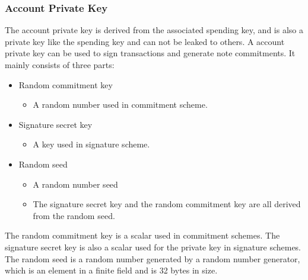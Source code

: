 \subsubsection{Account Private Key}\label{section: account-private-key}

The account private key is derived from the associated spending key, and is also a private key like the spending key and can not be leaked to others. A account private key can be used to sign transactions and generate note commitments. It mainly consists of three parts:

\begin{itemize}
    \item Random commitment key
        \begin{itemize}
            \item A random number used in commitment scheme.
        \end{itemize}
    \item Signature secret key
        \begin{itemize}
            \item A key used in signature scheme.
        \end{itemize}
    \item Random seed
        \begin{itemize}
            \item A random number seed
            \item The signature secret key and the random commitment key are all derived from the random seed.
        \end{itemize}
\end{itemize}

The random commitment key is a scalar used in commitment schemes. The signature secret key is also a scalar used for the private key in signature schemes. The random seed is a random number generated by a random number generator, which is an element in a finite field and is 32 bytes in size.